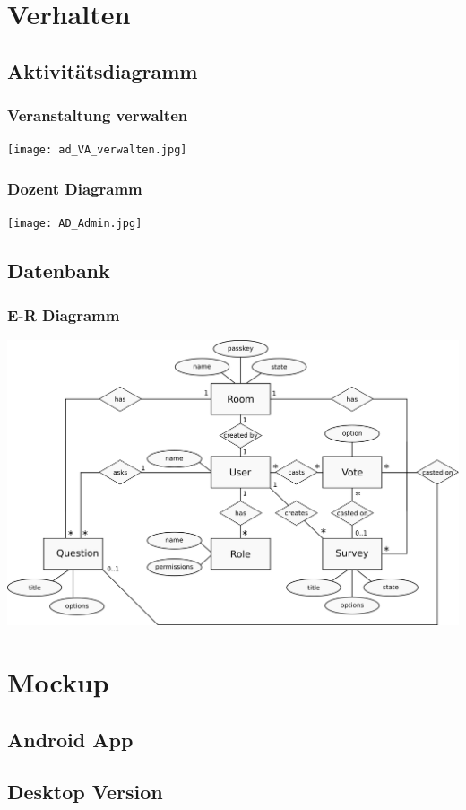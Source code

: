 \documentclass[german,a4paper]{beamer}
\begin{document}
\section{Verhalten}
\subsection{Aktivit\"{a}tsdiagramm}
\begin{frame}
\frametitle{Veranstaltung verwalten}
\texttt{[image: ad\_VA\_verwalten.jpg]}
\end{frame}

\begin{frame}
\frametitle{Dozent Diagramm}
\texttt{[image: AD\_Admin.jpg]}
\end{frame}

\subsection{Datenbank}
\begin{frame}
\frametitle{E-R Diagramm}
\includegraphics[width=1.0\textwidth]{er-diagram.png}
\end{frame}

\section{Mockup}
\subsection{Android App}
\subsection{Desktop Version}
\end{document}
